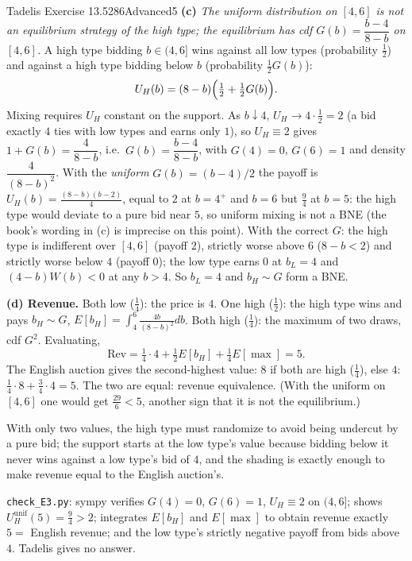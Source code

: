 \begin{exsol}{Tadelis Exercise 13.5}{286}{Advanced}{5}
\textbf{(c)} \emph{The uniform distribution on $[4,6]$ is not an equilibrium strategy of the high type;
the equilibrium has cdf $G(b)=\dfrac{b-4}{8-b}$ on $[4,6]$.} A high type bidding $b\in(4,6]$ wins against all
low types (probability $\tfrac12$) and against a high type bidding below $b$ (probability $\tfrac12G(b)$):
\[
  U_H(b)=(8-b)\Bigl(\tfrac12+\tfrac12G(b)\Bigr).
\]
Mixing requires $U_H$ constant on the support. As $b\downarrow4$, $U_H\to4\cdot\tfrac12=2$ (a bid exactly
$4$ ties with low types and earns only $1$), so $U_H\equiv2$ gives
$1+G(b)=\dfrac4{8-b}$, i.e.\ $G(b)=\dfrac{b-4}{8-b}$, with $G(4)=0$, $G(6)=1$ and density $\dfrac4{(8-b)^2}$.
With the \emph{uniform} $G(b)=(b-4)/2$ the payoff is $U_H(b)=\tfrac{(8-b)(b-2)}4$, equal to $2$ at $b=4^+$
and $b=6$ but $\tfrac94$ at $b=5$: the high type would deviate to a pure bid near $5$, so uniform
mixing is not a BNE (the book's wording in (c) is imprecise on this point). With the correct $G$:
the high type is indifferent over $[4,6]$ (payoff $2$), strictly worse above $6$ ($8-b<2$) and
strictly worse below $4$ (payoff $0$); the low type earns $0$ at $b_L=4$ and
$(4-b)W(b)<0$ at any $b>4$. So $b_L=4$ and $b_H\sim G$ form a BNE.

\textbf{(d) Revenue.} Both low ($\tfrac14$): the price is $4$. One high ($\tfrac12$): the high type
wins and pays $b_H\sim G$, $E[b_H]=\int_4^6\tfrac{4b}{(8-b)^2}db$. Both high ($\tfrac14$): the maximum of two
draws, cdf $G^2$. Evaluating,
\[
  \text{Rev}=\tfrac14\cdot4+\tfrac12E[b_H]+\tfrac14E[\max]=5 .
\]
The English auction gives the second-highest value: $8$ if both are high ($\tfrac14$), else $4$:
$\tfrac14\cdot8+\tfrac34\cdot4=5$. The two are equal: revenue equivalence. (With the uniform on
$[4,6]$ one would get $\tfrac{29}6<5$, another sign that it is not the equilibrium.)

\interp With only two values, the high type must randomize to avoid being undercut by a pure
bid; the support starts at the low type's value because bidding below it never wins against a
low type's bid of $4$, and the shading is exactly enough to make revenue equal to the English auction's.

\verify \texttt{check\_E3.py}: sympy verifies $G(4)=0$, $G(6)=1$, $U_H\equiv2$ on $(4,6]$; shows
$U_H^{\text{unif}}(5)=\tfrac94>2$; integrates $E[b_H]$ and $E[\max]$ to obtain revenue exactly $5=$ English
revenue; and the low type's strictly negative payoff from bids above $4$. Tadelis gives no answer.

\end{exsol}
